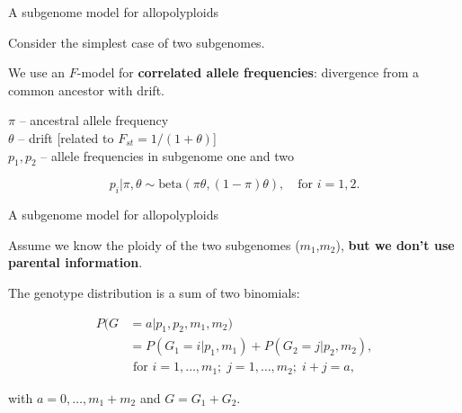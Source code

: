 \documentclass[presentation,sansserif,12pt]{beamer}
\begin{document}
\begin{frame}[t]{A subgenome model for allopolyploids}

Consider the simplest case of two subgenomes.
\vspace{0.3in}
\pause

We use an $F$-model for \textbf{correlated allele frequencies}: divergence from a common ancestor with drift.
\vspace{0.3in}
\pause


$\pi$ -- ancestral allele frequency\\
$\theta$ -- drift [related to $F_{st} = 1/(1+\theta)$] \\
$p_1,p_2$ -- allele frequencies in subgenome one and two\\
\vspace{0.3in}
\pause

\begin{equation}
p_i|\pi,\theta \sim \text{beta}(\pi\theta,(1-\pi)\theta), \quad \text{for } i=1,2.
\end{equation}

\end{frame}

\begin{frame}[t]{A subgenome model for allopolyploids}

Assume we know the ploidy of the two subgenomes ($m_1$,$m_2$), \textbf{but we don't use parental information}.
\vspace{0.3in}
\pause

The genotype distribution is a sum of two binomials:
\pause

\begin{align}
P(G&=a|p_1,p_2,m_1,m_2) \nonumber \\[0.05in]
&= P(G_1=i|p_1,m_1) + P(G_2=j|p_2,m_2), \nonumber \\[0.05in]
&\text{ for } i=1,\dots,m_1; \; j=1,\ldots,m_2; \; i+j=a,
\end{align}

with $a = 0,\dots,m_1+m_2$ and $G = G_1 + G_2$.

\end{frame}
\end{document}

